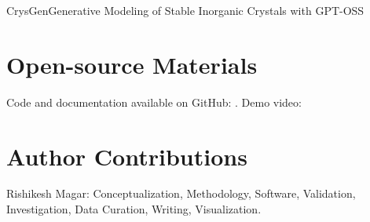 \begin{teamsubmission}{CrysGen}{Generative Modeling of Stable Inorganic Crystals with GPT-OSS}
\section*{Open-source Materials}
Code and documentation available on GitHub: . Demo video: 

\section*{Author Contributions}

Rishikesh Magar: 
Conceptualization, Methodology, Software, Validation, Investigation, Data Curation, Writing, Visualization.

\end{teamsubmission}




